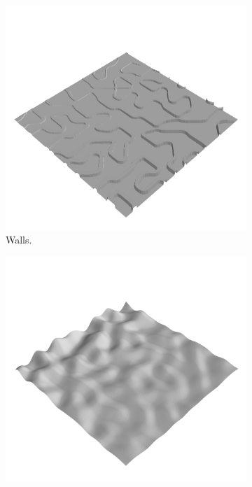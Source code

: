 \documentclass[../document.tex]{subfiles}
\begin{document}
\begin{figure} [htbp]
    \centering
    \begin{subfigure}[b]{0.24\textwidth}
        \includegraphics[width=\linewidth]{../img/hm3d/bars1.png}
        \caption{Walls.}
    \end{subfigure}
    \begin{subfigure}[b]{0.24\textwidth}
        \includegraphics[width=\linewidth]{../img/hm3d/bumps2.png}

\end{subfigure}
\end{figure}
\end{document}
